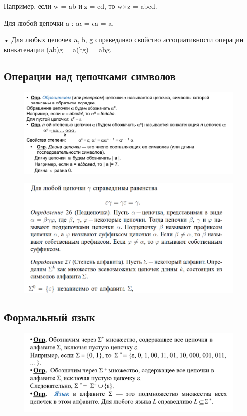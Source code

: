 \documentclass{article}
\begin{document}
Например, если w = ab и z = cd, то w×z = abcd.

Для любой цепочки a : a$\epsilon$ = $\epsilon$a = a.

• Для любых цепочек a, b, g справедливо свойство ассоциативности операции конкатенации (ab)g = a(bg) = abg.

\subsection{Операции над цепочками символов}

\begin{figure}[H]
    \centering
    \includegraphics[width=1\linewidth]{Снимок экрана 2025-02-13 093643.png}
\end{figure}

\begin{figure}[H]
    \centering
    \includegraphics[width=1\linewidth]{Снимок экрана 2025-02-13 093853.png}
\end{figure}

\subsection{Формальный язык}
\begin{figure}[H]
    \centering
    \includegraphics[width=1\linewidth]{Снимок экрана 2025-02-13 094552.png}
\end{figure}
\end{document}
